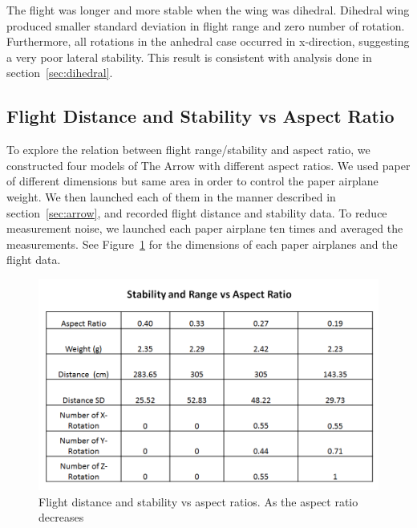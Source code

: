The flight was longer and more stable when the wing was dihedral. Dihedral wing produced smaller standard deviation in flight range and zero number of rotation. Furthermore, all rotations in the anhedral case occurred in x-direction, suggesting a very poor lateral stability. This result is consistent with analysis done in section~\ref{sec:dihedral}.

\subsection{Flight Distance and Stability vs Aspect Ratio}

To explore the relation between flight range/stability and aspect ratio, we constructed four models of The Arrow with different aspect ratios. We used paper of different dimensions but same area in order to control the paper airplane weight. We then launched each of them in the manner described in section~\ref{sec:arrow}, and recorded flight distance and stability data. To reduce measurement noise, we launched each paper airplane ten times and averaged the measurements. See Figure~\ref{fig:aspectratioresult} for the dimensions of each paper airplanes and the flight data. 

\begin{figure}[hl]
	\centering
		\includegraphics[scale=0.5]{figures/aspectratioresult.png}
		\caption{Flight distance and stability vs aspect ratios. As the aspect ratio decreases}
	\label{fig:aspectratioresult}
\end{figure}


